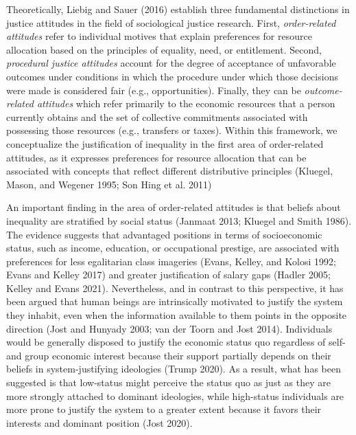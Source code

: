 \documentclass[
]{article}
\begin{document}
Theoretically, Liebig and Sauer (2016) establish three fundamental
distinctions in justice attitudes in the field of sociological justice
research. First, \emph{order-related attitudes} refer to individual
motives that explain preferences for resource allocation based on the
principles of equality, need, or entitlement. Second, \emph{procedural
justice attitudes} account for the degree of acceptance of unfavorable
outcomes under conditions in which the procedure under which those
decisions were made is considered fair (e.g., opportunities). Finally,
they can be \emph{outcome-related attitudes} which refer primarily to
the economic resources that a person currently obtains and the set of
collective commitments associated with possessing those resources (e.g.,
transfers or taxes). Within this framework, we conceptualize the
justification of inequality in the first area of order-related
attitudes, as it expresses preferences for resource allocation that can
be associated with concepts that reflect different distributive
principles (Kluegel, Mason, and Wegener 1995; Son Hing et al. 2011)

An important finding in the area of order-related attitudes is that
beliefs about inequality are stratified by social status (Janmaat 2013;
Kluegel and Smith 1986). The evidence suggests that advantaged positions
in terms of socioeconomic status, such as income, education, or
occupational prestige, are associated with preferences for less
egalitarian class imageries (Evans, Kelley, and Kolosi 1992; Evans and
Kelley 2017) and greater justification of salary gaps (Hadler 2005;
Kelley and Evans 2021). Nevertheless, and in contrast to this
perspective, it has been argued that human beings are intrinsically
motivated to justify the system they inhabit, even when the information
available to them points in the opposite direction (Jost and Hunyady
2003; van der Toorn and Jost 2014). Individuals would be generally
disposed to justify the economic status quo regardless of self- and
group economic interest because their support partially depends on their
beliefs in system-justifying ideologies (Trump 2020). As a result, what
has been suggested is that low-status might perceive the status quo as
just as they are more strongly attached to dominant ideologies, while
high-status individuals are more prone to justify the system to a
greater extent because it favors their interests and dominant position
(Jost 2020).
\end{document}
